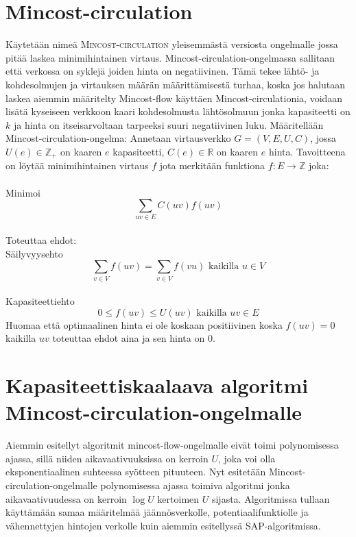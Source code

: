 \documentclass[a4paper, 11pt]{article}
\begin{document}
\section*{Mincost-circulation}
Käytetään nimeä \textsc{Mincost-circulation} yleisemmästä versiosta ongelmalle jossa pitää
laskea minimihintainen virtaus. Mincost-circulation-ongelmassa sallitaan että
verkossa on syklejä joiden hinta on negatiivinen. Tämä tekee lähtö- ja kohdesolmujen
ja virtauksen määrän määrittämisestä turhaa, koska jos halutaan laskea aiemmin määritelty
Mincost-flow käyttäen Mincost-circulationia, voidaan lisätä kyseiseen verkkoon kaari 
kohdesolmusta lähtösolmuun jonka kapasiteetti on $k$ ja hinta on itseisarvoltaan
tarpeeksi suuri negatiivinen luku. Määritellään Mincost-circulation-ongelma: 
Annetaan virtausverkko $G = (V, E, U, C)$, jossa $U(e) \in \mathbb{Z_+}$ on 
kaaren $e$ kapasiteetti, $C(e) \in \mathbb{R}$ on kaaren $e$ hinta. Tavoitteena on löytää minimihintainen virtaus
$f$ jota merkitään funktiona
$f : E \rightarrow \mathbb{Z}$ joka: \\\\ Minimoi $$\sum_{uv \in E} C(uv) f(uv)$$\\
Toteuttaa ehdot:\\ Säilyvyysehto
$$\sum_{v \in V} f(uv) = \sum_{v \in V} f(vu) \text{ kaikilla } u \in V$$
\\Kapasiteettiehto
$$0 \le f(uv) \le U(uv) \text{ kaikilla } uv \in E$$
Huomaa että optimaalinen hinta ei ole koskaan positiivinen koska $f(uv) = 0$ kaikilla
$uv$ toteuttaa ehdot aina ja sen hinta on $0$.
\section*{Kapasiteettiskaalaava algoritmi Mincost-circulation-ongelmalle}
Aiemmin esitellyt algoritmit mincost-flow-ongelmalle eivät toimi polynomisessa ajassa,
sillä niiden aikavaativuuksissa on kerroin $U$, joka voi olla eksponentiaalinen suhteessa
syötteen pituuteen. Nyt esitetään Mincost-circulation-ongelmalle polynomisessa ajassa toimiva
algoritmi jonka aikavaativuudessa on kerroin $\log U$ kertoimen $U$ sijasta. Algoritmissa
tullaan käyttämään samaa määritelmää jäännösverkolle, potentiaalifunktiolle ja vähennettyjen
hintojen verkolle kuin aiemmin esitellyssä SAP-algoritmissa.
\end{document}
